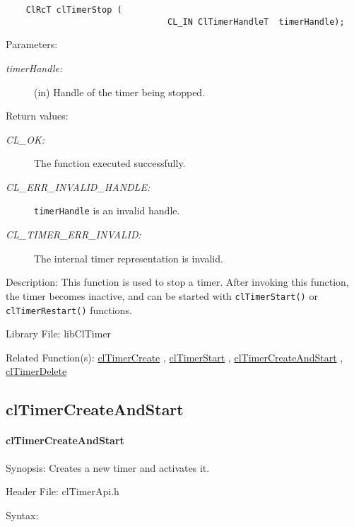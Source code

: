 \begin{flushleft}
\begin{Desc}
\footnotesize\begin{verbatim}    ClRcT clTimerStop (
                        		CL_IN ClTimerHandleT  timerHandle);
\end{verbatim}
\normalsize
\end{Desc}
\begin{Desc}
\item[Parameters:]
\begin{description}
\item[{\em timer\-Handle:}](in) Handle of the timer being stopped.\end{description}
\end{Desc}
\begin{Desc}
\item[Return values:]
\begin{description}
\item[{\em CL\_\-OK:}]The function executed successfully. 
\item[{\em CL\_\-ERR\_\-INVALID\_\-HANDLE:}]{\tt{timerHandle}} is an invalid handle. 
\item[{\em CL\_\-TIMER\_\-ERR\_\-INVALID:}]The internal timer representation is invalid.\end{description}
\end{Desc}
\begin{Desc}
\item[Description:]This function is used to stop a timer. After invoking this function, the timer becomes inactive, and can be started with 
{\tt{clTimerStart()}} or {\tt{clTimerRestart()}} functions.\end{Desc}
\begin{Desc}
\item[Library File:]lib\-Cl\-Timer\end{Desc}
\begin{Desc}
\item[Related Function(s):]\hyperlink{pagetmr104}{cl\-Timer\-Create} , \hyperlink{pagetmr106}{cl\-Timer\-Start} , 
\hyperlink{group__group33}{cl\-Timer\-Create\-And\-Start} , \hyperlink{group__group33}{cl\-Timer\-Delete} 
\end{Desc}


\newpage

\subsection{clTimerCreateAndStart}
\hypertarget{pagetmr108}{}\paragraph{cl\-Timer\-Create\-And\-Start}\label{pagetmr108}
\begin{Desc}
\item[Synopsis:]Creates a new timer and activates it.\end{Desc}
\begin{Desc}
\item[Header File:]clTimerApi.h\end{Desc}
\begin{Desc}
\item[Syntax:]


\end{Desc}
\end{flushleft}
